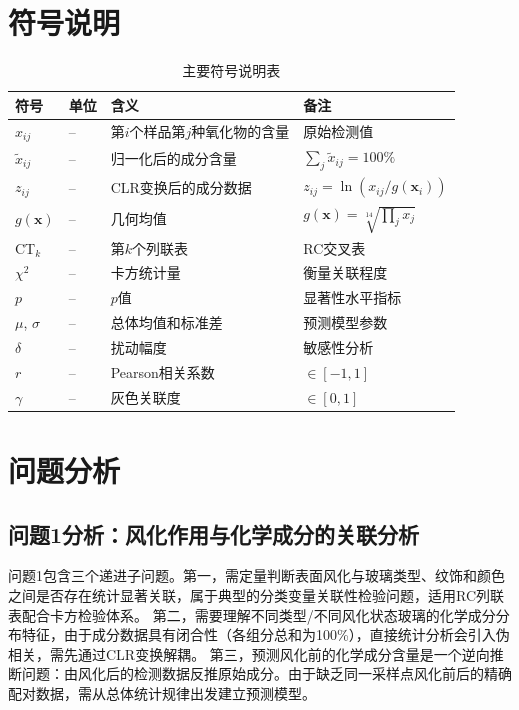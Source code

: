 \documentclass[12pt,a4paper]{ctexart}
\begin{document}
\section{符号说明}

\begin{table}[H]
\centering
\caption{主要符号说明表}
\label{tab:symbols}
\begin{tabularx}{\textwidth}{p{2.5cm}p{1.8cm}p{6.5cm}Y}
\toprule
符号 & 单位 & 含义 & 备注 \\
\midrule
$x_{ij}$  & --  & 第$i$个样品第$j$种氧化物的含量 & 原始检测值 \\
$\tilde{x}_{ij}$ & -- & 归一化后的成分含量 & $\sum_j \tilde{x}_{ij}=100\%$ \\
$z_{ij}$  & --  & CLR变换后的成分数据 & $z_{ij}=\ln(x_{ij}/g(\mathbf{x}_i))$ \\
$g(\mathbf{x})$ & -- & 几何均值 & $g(\mathbf{x})=\sqrt[14]{\prod_j x_j}$ \\
CT$_k$ & -- & 第$k$个列联表 & RC交叉表 \\
$\chi^2$ & -- & 卡方统计量 & 衡量关联程度 \\
$p$ & -- & $p$值 & 显著性水平指标 \\
$\mu$, $\sigma$ & -- & 总体均值和标准差 & 预测模型参数 \\
$\delta$ & -- & 扰动幅度 & 敏感性分析 \\
$r$ & -- & Pearson相关系数 & $\in[-1,1]$ \\
$\gamma$ & -- & 灰色关联度 & $\in[0,1]$ \\
\bottomrule
\end{tabularx}
\end{table}


\section{问题分析}

\subsection{问题1分析：风化作用与化学成分的关联分析}

问题1包含三个递进子问题。第一，需定量判断表面风化与玻璃类型、纹饰和颜色之间是否存在统计显著关联，属于典型的分类变量关联性检验问题，适用RC列联表配合卡方检验体系。
第二，需要理解不同类型/不同风化状态玻璃的化学成分分布特征，由于成分数据具有闭合性（各组分总和为100\%），直接统计分析会引入伪相关，需先通过CLR变换解耦\cite{2}。
第三，预测风化前的化学成分含量是一个逆向推断问题：由风化后的检测数据反推原始成分。由于缺乏同一采样点风化前后的精确配对数据，需从总体统计规律出发建立预测模型。
\end{document}
